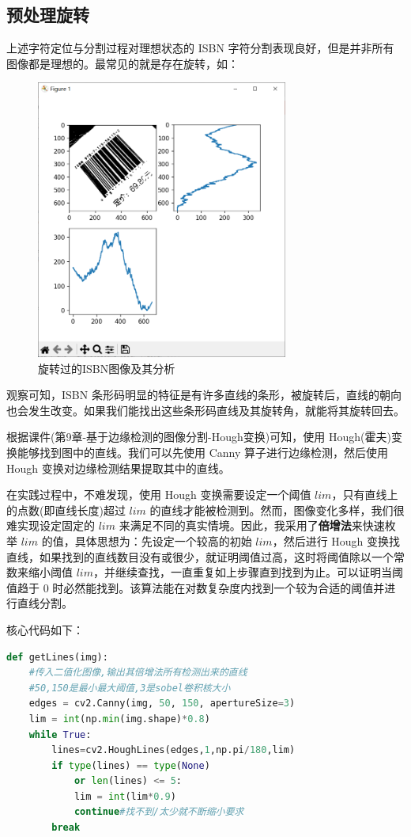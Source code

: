 \documentclass{ctexart}
\begin{document}
\subsection{预处理旋转}
上述字符定位与分割过程对理想状态的 ISBN 字符分割表现良好，但是并非所有图像都是理想的。最常见的就是存在旋转，如：

\begin{figure}[H]
    \centering
    \includegraphics[height=260pt]{isbn_rotated}
    \caption{旋转过的ISBN图像及其分析}
\end{figure}

观察可知，ISBN 条形码明显的特征是有许多直线的条形，被旋转后，直线的朝向也会发生改变。如果我们能找出这些条形码直线及其旋转角，就能将其旋转回去。

根据课件(第9章-基于边缘检测的图像分割-Hough变换)可知，使用 Hough(霍夫)变换能够找到图中的直线。我们可以先使用 Canny 算子进行边缘检测，然后使用 Hough 变换对边缘检测结果提取其中的直线。

在实践过程中，不难发现，使用 Hough 变换需要设定一个阈值 $lim$，只有直线上的点数(即直线长度)超过 $lim$ 的直线才能被检测到。然而，图像变化多样，我们很难实现设定固定的 $lim$ 来满足不同的真实情境。因此，我采用了\textbf{倍增法}来快速枚举 $lim$ 的值，具体思想为：先设定一个较高的初始 $lim$，然后进行 Hough 变换找直线，如果找到的直线数目没有或很少，就证明阈值过高，这时将阈值除以一个常数来缩小阈值 $lim$，并继续查找，一直重复如上步骤直到找到为止。可以证明当阈值趋于 $0$ 时必然能找到。该算法能在对数复杂度内找到一个较为合适的阈值并进行直线分割。

核心代码如下：

\begin{lstlisting}[language=python]
def getLines(img):
    #传入二值化图像,输出其倍增法所有检测出来的直线
    #50,150是最小最大阈值,3是sobel卷积核大小
    edges = cv2.Canny(img, 50, 150, apertureSize=3)
    lim = int(np.min(img.shape)*0.8)
    while True:
        lines=cv2.HoughLines(edges,1,np.pi/180,lim)
        if type(lines) == type(None) 
            or len(lines) <= 5:
            lim = int(lim*0.9)
            continue#找不到/太少就不断缩小要求
        break
\end{lstlisting}
\end{document}
